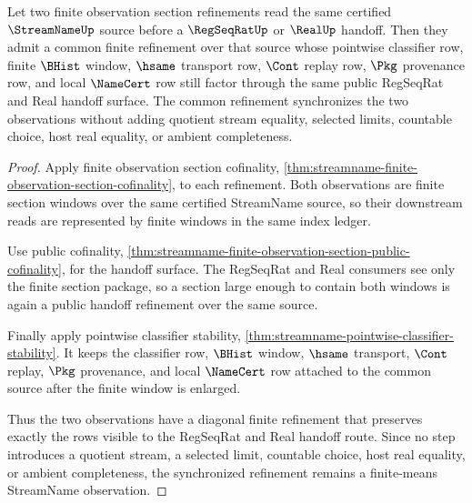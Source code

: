 \begin{theorem}
\label{thm:streamname-finite-observation-diagonal-coherence}
Let two finite observation section refinements read the same certified $\StreamNameUp$ source before a $\RegSeqRatUp$ or $\RealUp$ handoff. Then they admit a common finite refinement over that source whose pointwise classifier row, finite $\BHist$ window, $\hsame$ transport row, $\Cont$ replay row, $\Pkg$ provenance row, and local $\NameCert$ row still factor through the same public RegSeqRat and Real handoff surface. The common refinement synchronizes the two observations without adding quotient stream equality, selected limits, countable choice, host real equality, or ambient completeness.
\end{theorem}
\begin{proof}
Apply finite observation section cofinality, \autoref{thm:streamname-finite-observation-section-cofinality}, to each refinement. Both observations are finite section windows over the same certified StreamName source, so their downstream reads are represented by finite windows in the same index ledger.

Use public cofinality, \autoref{thm:streamname-finite-observation-section-public-cofinality}, for the handoff surface. The RegSeqRat and Real consumers see only the finite section package, so a section large enough to contain both windows is again a public handoff refinement over the same source.

Finally apply pointwise classifier stability, \autoref{thm:streamname-pointwise-classifier-stability}. It keeps the classifier row, $\BHist$ window, $\hsame$ transport, $\Cont$ replay, $\Pkg$ provenance, and local $\NameCert$ row attached to the common source after the finite window is enlarged.

Thus the two observations have a diagonal finite refinement that preserves exactly the rows visible to the RegSeqRat and Real handoff route. Since no step introduces a quotient stream, a selected limit, countable choice, host real equality, or ambient completeness, the synchronized refinement remains a finite-means StreamName observation.
\end{proof}

